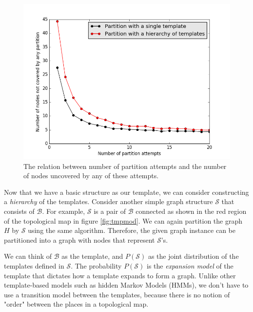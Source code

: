 \documentclass[10pt, titlepage]{article}
\theoremstyle{definition}
\begin{document}
\begin{figure}[!htb]
    \centering
    \captionsetup{width=.8\linewidth}
    \includegraphics[scale=0.5]{images/partition_loss.png}
    \caption{The relation between number of partition attempts and the number of nodes uncovered by any of these attempts.}
    \label{fig:part_drop}
\end{figure}

Now that we have a basic structure as our template, we can consider constructing a \textit{hierarchy} of the templates. Consider another simple graph structure $\mathcal{S}$ that consists of $\mathcal{B}$. For example, $\mathcal{S}$ is a pair of $\mathcal{B}$ connected as shown in the red region of the topological map in figure \ref{fig:tmpmod}. We can again partition the graph $H$ by $\mathcal{S}$ using the same algorithm. Therefore, the given graph instance can be partitioned into a graph with nodes that represent $\mathcal{S}$'s.

We can think of $\mathcal{B}$ as the template, and $P(\mathcal{S})$ as the joint distribution of the templates defined in $\mathcal{S}$. The probability $P(\mathcal{S})$ is the \textit{expansion model} of the template that dictates how a template expands to form a graph. Unlike other template-based models such as hidden Markov Models (HMMs), we don't have to use a transition model between the templates, because there is no notion of "order" between the places in a topological map.
\end{document}
